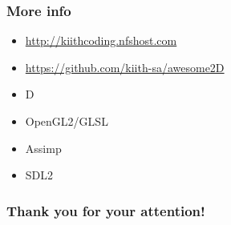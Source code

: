 \documentclass{beamer}
\begin{document}
\begin{frame}\frametitle{More info}

\begin{itemize}
\item
  \href{http://kiithcoding.nfshost.com}{http://kiithcoding.nfshost.com}
\item
  \href{https://github.com/kiith-sa/awesome2D}{https://github.com/kiith-sa/awesome2D}
\item
  D
\item
  OpenGL2/GLSL
\item
  Assimp
\item
  SDL2
\end{itemize}

\end{frame}

\begin{frame}\frametitle{Thank you for your attention!}

\end{frame}
\end{document}
